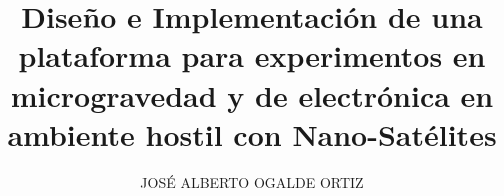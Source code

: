 \documentclass[spanish,letterpaper]{templates/uchile-tesis}
\title{Diseño e Implementación de una plataforma para experimentos en microgravedad y de electrónica en ambiente hostil con Nano-Satélites}
\author{JOSÉ ALBERTO OGALDE ORTIZ}
\begin{document}
\listoftodos
\newpage

\maketitle



 

 

 







\end{document}

